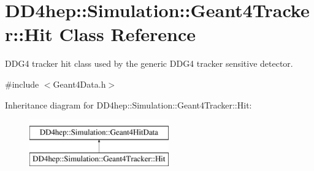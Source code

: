 \hypertarget{class_d_d4hep_1_1_simulation_1_1_geant4_tracker_1_1_hit}{}\section{D\+D4hep\+:\+:Simulation\+:\+:Geant4\+Tracker\+:\+:Hit Class Reference}
\label{class_d_d4hep_1_1_simulation_1_1_geant4_tracker_1_1_hit}


D\+D\+G4 tracker hit class used by the generic D\+D\+G4 tracker sensitive detector.  




{\ttfamily \#include $<$Geant4\+Data.\+h$>$}

Inheritance diagram for D\+D4hep\+:\+:Simulation\+:\+:Geant4\+Tracker\+:\+:Hit\+:\begin{figure}[H]
\begin{center}
\leavevmode
\includegraphics[height=2.000000cm]{class_d_d4hep_1_1_simulation_1_1_geant4_tracker_1_1_hit}
\end{center}
\end{figure}
